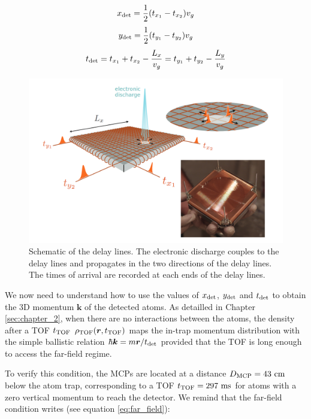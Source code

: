 \begin{equation}
    x_{\rm{det}}=\frac{1}{2} (t_{x_1}-t_{x_2})v_g
\end{equation}
\begin{equation}
    y_{\rm{det}}=\frac{1}{2} (t_{y_1}-t_{y_2})v_g
\end{equation}
\begin{equation}
    t_{\rm{det}}=t_{x_{1}}+t_{x_{2}}-\frac{L_{x}}{v_{g}}=t_{y_{1}}+t_{y_{2}}-\frac{L_{y}}{v_{g}}
    \label{eq:tdet_MCP}
\end{equation}

\begin{figure}[ht!]
    \centering
    \includegraphics[width=\textwidth]{Fig/Chapter3/delay_lines.png}
    \caption{Schematic of the delay lines. The electronic discharge couples to the delay lines and propagates in the two directions of the delay lines. The times of arrival are recorded at each ends of the delay lines.}
    \label{fig:delay_lines}
\end{figure}

We now need to understand how to use the values of $x_{\rm{det}}$, $y_{\rm{det}}$ and $t_{\rm{det}}$ to obtain the 3D momentum $\bm{k}$ of the detected atoms. As detailled in Chapter \ref{sec:chapter_2}, when there are no interactions between the atoms, the density after a TOF $t_{\rm{TOF}}$ $\rho_{\rm{TOF}} (\bm{r},t_{\rm{TOF}})$ maps the in-trap momentum distribution with the simple ballistic relation $\hbar \bm{k} = m \bm{r}/t_{\rm{det}}$ provided that the TOF is long enough to access the far-field regime. 

To verify this condition, the MCPs are located at a distance $D_{\rm{MCP}}=43 \ \rm{cm}$ below the atom trap, corresponding to a TOF $t_{\rm{TOF}}=297 \ \rm{ms}$ for atoms with a zero vertical momentum to reach the detector. We remind that the far-field condition writes (see equation \ref{eq:far_field}):

